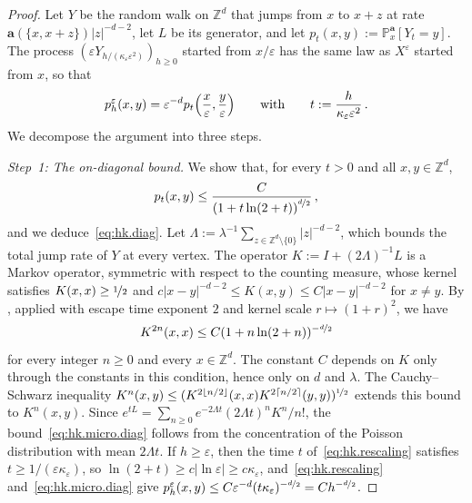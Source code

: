 \documentclass[11pt]{amsart}
\numberwithin{equation}{section}
\newcommand{\Z}{\mathbb{Z}}
\newcommand{\PP}{\mathbb{P}}
\newcommand{\ba}{\mathbf{a}}
\newcommand{\eps}{\varepsilon}
\newcommand{\nf}{\nicefrac}
\begin{document}
\begin{proof}
Let $Y$ be the random walk on $\Z^d$ that jumps from $x$ to $x + z$ at rate $\ba(\{x, x+z\}) |z|^{-d-2}$, let $L$ be its generator, and let $p_t(x,y) := \PP^\ba_x[Y_t = y]$.
The process $(\eps Y_{h/(\kappa_\eps \eps^2)})_{h \geq 0}$ started from $x/\eps$ has the same law as $X^\eps$ started from $x$, so that
\begin{equation} \label{eq:hk.rescaling}
    p^\eps_h(x,y) = \eps^{-d} p_t \Bigl( \frac{x}{\eps}, \frac{y}{\eps} \Bigr) \qquad \text{with} \qquad t := \frac{h}{\kappa_\eps \eps^2}\,.
\end{equation}
We decompose the argument into three steps.

\smallskip

\emph{Step~1: The on-diagonal bound.}
We show that, for every $t > 0$ and all $x, y \in \Z^d$,
\begin{equation} \label{eq:hk.micro.diag}
    p_t(x, y) \leq \frac{C}{\left(1 + t \ln (2 + t) \right)^{\nf{d}{2}}}\,,
\end{equation}
and we deduce~\eqref{eq:hk.diag}.
Let $\Lambda := \lambda^{-1} \sum_{z \in \Z^d \setminus \{0\}} |z|^{-d-2}$, which bounds the total jump rate of $Y$ at every vertex.
The operator $K := I + (2 \Lambda)^{-1} L$ is a Markov operator, symmetric with respect to the counting measure, whose kernel satisfies $K(x,x) \geq \nf12$ and $c |x-y|^{-d-2} \leq K(x,y) \leq C |x-y|^{-d-2}$ for $x \neq y$.
By \citet[Theorem~1.1]{MSC2015}, applied with escape time exponent $2$ and kernel scale $r \mapsto (1+r)^2$, we have
\begin{equation*}
    K^{2n}(x,x) \leq C (1 + n \ln(2+n))^{-\nf{d}{2}}
\end{equation*}
for every integer $n \geq 0$ and every $x \in \Z^d$.
The constant $C$ depends on $K$ only through the constants in this condition, hence only on $d$ and $\lambda$.
The Cauchy--Schwarz inequality $K^n(x,y) \leq (K^{2 \lfloor n/2 \rfloor}(x,x) K^{2 \lceil n/2 \rceil}(y,y))^{\nf12}$ extends this bound to $K^n(x,y)$.
Since $e^{t L} = \sum_{n \geq 0} e^{-2 \Lambda t} (2 \Lambda t)^n K^n / n!$, the bound~\eqref{eq:hk.micro.diag} follows from the concentration of the Poisson distribution with mean $2 \Lambda t$.
If $h \geq \eps$, then the time $t$ of~\eqref{eq:hk.rescaling} satisfies $t \geq 1/(\eps \kappa_\eps)$, so $\ln(2 + t) \geq c |\ln \eps| \geq c \kappa_\eps$, and~\eqref{eq:hk.rescaling} and~\eqref{eq:hk.micro.diag} give $p^\eps_h(x,y) \leq C \eps^{-d} (t \kappa_\eps)^{-\nf{d}{2}} = C h^{-\nf{d}{2}}$.


\end{proof}
\end{document}
